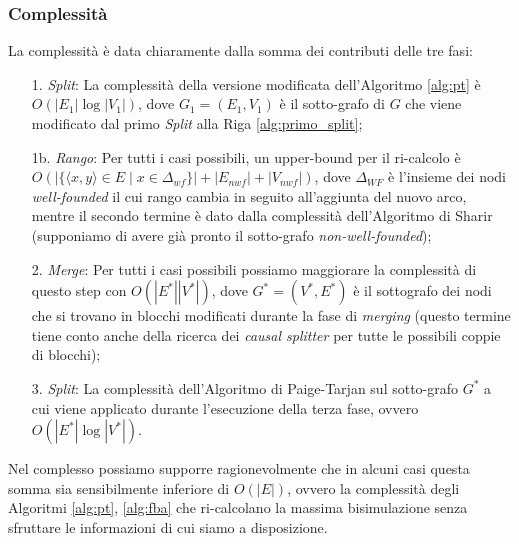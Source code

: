 \subsubsection{Complessità}
La complessità è data chiaramente dalla somma dei contributi delle tre fasi:
\begin{enumerate}
    \item[1.] \emph{Split}: La complessità della versione modificata dell'Algoritmo \ref{alg:pt} è $O(|E_1|\log |V_1|)$, dove $G_1=(E_1, V_1)$ è il sotto-grafo di $G$ che viene modificato dal primo \emph{Split} alla Riga \ref{alg:primo_split};
    \item[1b.] \emph{Rango}: Per tutti i casi possibili, un upper-bound per il ri-calcolo è $O(|\{\langle x,y\rangle \in E \mid x \in \Delta_{wf}\}| + |E_{nwf}| + |V_{nwf}|)$, dove $\Delta_{WF}$ è l'insieme dei nodi \emph{well-founded} il cui rango cambia in seguito all'aggiunta del nuovo arco, mentre il secondo termine è dato dalla complessità dell'Algoritmo di Sharir \cite{sharir} (supponiamo di avere già pronto il sotto-grafo \emph{non-well-founded});
    \item[2.] \emph{Merge}: Per tutti i casi possibili possiamo maggiorare la complessità di questo step con $O(|E^*||V^*|)$, dove $G^*=(V^*,E^*)$ è il sottografo dei nodi che si trovano in blocchi modificati durante la fase di \emph{merging} (questo termine tiene conto anche della ricerca dei \emph{causal splitter} per tutte le possibili coppie di blocchi);
    \item[3.] \emph{Split}: La complessità dell'Algoritmo di Paige-Tarjan sul sotto-grafo $G^*$ a cui viene applicato durante l'esecuzione della terza fase, ovvero $O(|E^*| \log |V^*|)$.
\end{enumerate}
Nel complesso possiamo supporre ragionevolmente che in alcuni casi questa somma sia sensibilmente inferiore di $O(|E|)$, ovvero la complessità degli Algoritmi \ref{alg:pt}, \ref{alg:fba} che ri-calcolano la massima bisimulazione senza sfruttare le informazioni di cui siamo a disposizione.
